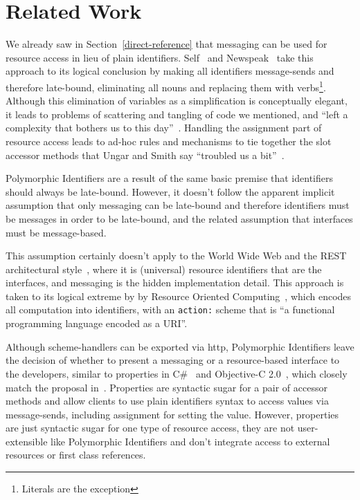 \documentclass{acm_proc_article-sp}
\begin{document}
\section{Related Work}
\label{related-work}


We already saw in Section~\ref{direct-reference} that messaging can be used for resource
access in lieu of plain identifiers.  Self~\cite{UngarS87} and Newspeak~\cite{Bracha:2010:MON:1883978.1884007} take this
approach to its logical conclusion by making all identifiers message-sends and therefore late-bound, eliminating
all nouns and replacing them with verbs\footnote{Literals are the exception}.  Although
this elimination of variables as a simplification is conceptually elegant, it leads to problems of scattering and tangling of code we
mentioned, and  ``left a complexity that bothers us to this day''~\cite{Ungar:2007:SEL:1238844.1238853}.
Handling the assignment part of resource access leads to ad-hoc rules and mechanisms to tie together
the slot accessor methods that Ungar and Smith say ``troubled us a bit''~\cite{Ungar:2007:SEL:1238844.1238853}.

Polymorphic Identifiers are a result of the same basic premise that identifiers should always be late-bound.  However,
it doesn't follow the apparent implicit assumption that only messaging can be late-bound and therefore identifiers must
be messages in order to be late-bound, and the related assumption that interfaces must be message-based.

This assumption certainly doesn't apply to the World Wide Web and the REST architectural style~\cite{fielding-rest}, where
it is (universal) resource identifiers that are the interfaces, and messaging is the hidden implementation detail.  This 
approach is taken to its logical extreme by  by Resource Oriented Computing~\cite{roc},
which encodes all computation into identifiers, with an {\tt action:} scheme that is ``a functional programming language encoded as a URI''.

Although scheme-handlers can be exported via http, Polymorphic Identifiers leave the decision of whether to present a messaging
or a resource-based interface to the developers,
similar to properties in C\#~\cite{Archer:2001:IC:516715} and Objective-C 2.0~\cite{Kochan:2009:PO:1538451}, which closely match the proposal in~\cite{Spinellis:2002:MPC:510857.510868}.  Properties are syntactic sugar for a pair of accessor methods and allow clients to use 
 plain identifiers syntax to access values via message-sends, including assignment for setting the value.   However, properties
 are just syntactic sugar for one type of resource access, they are not user-extensible like Polymorphic Identifiers 
 and don't integrate access to external resources or first class references.
\end{document}
